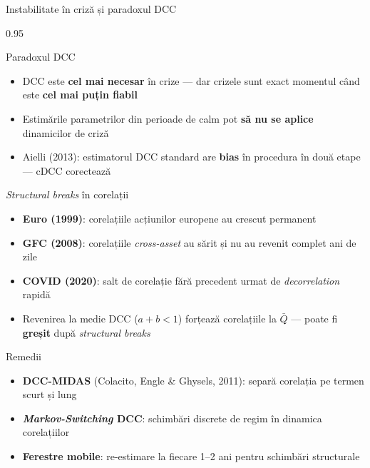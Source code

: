 \documentclass[9pt, aspectratio=169, t]{beamer}
\begin{document}
\begin{frame}{Instabilitate în criză și paradoxul DCC}
    \begin{cminipage}{0.95\textwidth}
    \vspace{-3mm}
    {\scriptsize
    \begin{block}{Paradoxul DCC}
        \begin{itemize}\setlength{\itemsep}{0pt}
            \item DCC este \textbf{cel mai necesar} în crize --- dar crizele sunt exact momentul când este \textbf{cel mai puțin fiabil}
            \item Estimările parametrilor din perioade de calm pot \textbf{să nu se aplice} dinamicilor de criză
            \item Aielli (2013): estimatorul DCC standard are \textbf{bias} în procedura în două etape --- cDCC corectează
        \end{itemize}
    \end{block}
    \vspace{-2mm}
    \begin{block}{\textit{Structural breaks} în corelații}
        \begin{itemize}\setlength{\itemsep}{0pt}
            \item \textbf{Euro (1999)}: corelațiile acțiunilor europene au crescut permanent
            \item \textbf{GFC (2008)}: corelațiile \textit{cross-asset} au sărit și nu au revenit complet ani de zile
            \item \textbf{COVID (2020)}: salt de corelație fără precedent urmat de \textit{decorrelation} rapidă
            \item Revenirea la medie DCC ($a + b < 1$) forțează corelațiile la $\bar{Q}$ --- poate fi \textbf{greșit} după \textit{structural breaks}
        \end{itemize}
    \end{block}
    \vspace{-2mm}
    \begin{alertblock}{Remedii}
        \begin{itemize}\setlength{\itemsep}{0pt}
            \item \textbf{DCC-MIDAS} (Colacito, Engle \& Ghysels, 2011): separă corelația pe termen scurt și lung
            \item \textbf{\textit{Markov-Switching} DCC}: schimbări discrete de regim în dinamica corelațiilor
            \item \textbf{Ferestre mobile}: re-estimare la fiecare 1--2 ani pentru schimbări structurale
        \end{itemize}
    \end{alertblock}
    }
    \end{cminipage}
\end{frame}
\end{document}

